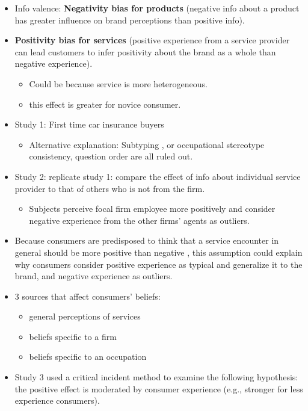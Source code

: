 \documentclass[
]{book}
\providecommand{\tightlist}{%
  \setlength{\itemsep}{0pt}\setlength{\parskip}{0pt}}
\begin{document}
\begin{itemize}
\item
  Info valence: \textbf{Negativity bias for products} (negative info about a product has greater influence on brand perceptions than positive info). \citep{herr1991}
\item
  \textbf{Positivity bias for services} (positive experience from a service provider can lead customers to infer positivity about the brand as a whole than negative experience).

  \begin{itemize}
  \item
    Could be because service is more heterogeneous.
  \item
    this effect is greater for novice consumer.
  \end{itemize}
\item
  Study 1: First time car insurance buyers

  \begin{itemize}
  \tightlist
  \item
    Alternative explanation: Subtyping \citep{weber1983}, or occupational stereotype consistency, question order are all ruled out.
  \end{itemize}
\item
  Study 2: replicate study 1: compare the effect of info about individual service provider to that of others who is not from the firm.

  \begin{itemize}
  \tightlist
  \item
    Subjects perceive focal firm employee more positively and consider negative experience from the other firms' agents as outliers.
  \end{itemize}
\item
  Because consumers are predisposed to think that a service encounter in general should be more positive than negative \citep{fornell2005}, this assumption could explain why consumers consider positive experience as typical and generalize it to the brand, and negative experience as outliers.
\item
  3 sources that affect consumers' beliefs:

  \begin{itemize}
  \item
    general perceptions of services
  \item
    beliefs specific to a firm
  \item
    beliefs specific to an occupation
  \end{itemize}
\item
  Study 3 used a critical incident method to examine the following hypothesis: the positive effect is moderated by consumer experience (e.g., stronger for less experience consumers).


\end{itemize}
\end{document}
